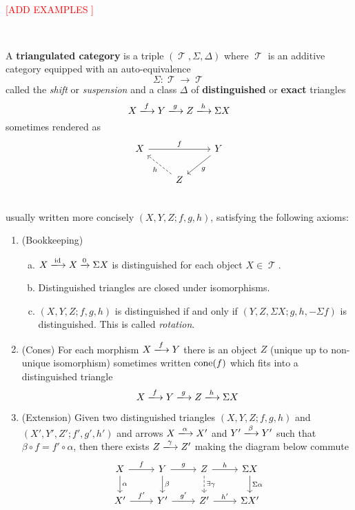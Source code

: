 \documentclass[11pt]{article}
\DeclareMathOperator{\TT}{\mathcal{T}}
\begin{document}
\

\large{\textcolor{red}{[ADD EXAMPLES ]}} \normalsize

\

\begin{defn}\label{tricat}
A \textbf{triangulated category} is a triple $(\TT,\Sigma,\Delta)$ where $\TT$ is an additive category equipped with an auto-equivalence 
\[
	\Sigma: \TT \to \TT
\] called the \textit{shift} or \textit{suspension} and a class $\Delta$ of \textbf{distinguished} or \textbf{exact} triangles
\[
	X \xlongrightarrow{f} Y \xlongrightarrow{g} Z \xlongrightarrow{h} \Sigma X
\] sometimes rendered as 
\[\begin{tikzcd}
X \ar[rr,"f"] &  & Y \ar[dl,"g"]  \\
  &  Z \ar[ul,dashed,"h"] &  \\
\end{tikzcd}\]
usually written more concisely $(X,Y,Z; f,g,h)$, satisfying the following axioms:
\begin{enumerate}[TC1.]
	\item (Bookkeeping)
		\begin{enumerate}[a.]
			\item $X \xlongrightarrow{\id} X \xrightarrow{0} \Sigma X$ is distinguished for each object $X \in \TT$.
			\item Distinguished triangles are closed under isomorphisms.
			\item $(X,Y,Z; f,g,h)$ is distinguished if and only if $(Y,Z,\Sigma X; g,h,-\Sigma f)$ is distinguished. This is called \textit{rotation}.
		\end{enumerate}
	\item (Cones) For each morphism $X \xlongrightarrow{f} Y$ there is an object $Z$ (unique up to non-unique isomorphism) sometimes written $\operatorname{cone}(f)$ which fits into a distinguished triangle 
	\[
		X \xlongrightarrow{f} Y \xlongrightarrow{g} Z \xlongrightarrow{h} \Sigma X
	\]
\item (Extension) Given two distinguished triangles $(X,Y,Z; f,g,h)$ and $(X',Y',Z'; f', g', h')$ and arrows $X \xlongrightarrow{\alpha} X'$ and $Y' \xlongrightarrow{\beta} Y'$ such that $\beta \circ f = f' \circ \alpha$, then there exists $Z \xlongrightarrow{\gamma} Z'$ making the diagram below commute
\[\begin{tikzcd}
X \ar[r,"f"] \ar[d,"\alpha"] & Y \ar[r,"g"] \ar[d,"\beta"] & Z \ar[r,"h"] \ar[d,dashed,"\exists \gamma"] & \Sigma X \ar[d,"\Sigma \alpha"]\\
X'\ar[r,"f'"] & Y' \ar[r,"g'"] & Z' \ar[r,"h'"]& \Sigma X' \\
\end{tikzcd}\]


\end{enumerate}
\end{defn}
\end{document}
